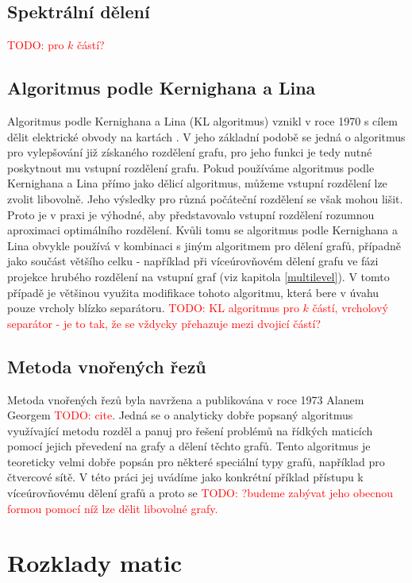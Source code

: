 \documentclass[11pt,american,czech,oneside]{book}
\theoremstyle{plain}
\theoremstyle{definition}
\newcommand{\TODO}[1]{\textcolor{red}{TODO: #1}}
\begin{document}
\section{Spektrální dělení}
\label{spektral}
\TODO{pro $k$ částí?}


\section{Algoritmus podle Kernighana a Lina}
\label{KLalgorithm}
Algoritmus podle Kernighana a Lina (KL algoritmus) vznikl v roce 1970 s cílem dělit elektrické obvody na kartách \cite{keli:70}. V jeho základní podobě se jedná o algoritmus pro vylepšování již získaného rozdělení grafu, pro jeho funkci je tedy nutné poskytnout mu vstupní rozdělení grafu. Pokud používáme algoritmus podle Kernighana a Lina přímo jako dělicí algoritmus, můžeme vstupní rozdělení lze zvolit libovolně. Jeho výsledky pro různá počáteční rozdělení se však mohou lišit. Proto je v praxi je výhodné, aby představovalo vstupní rozdělení rozumnou aproximaci optimálního rozdělení. Kvůli tomu se algoritmus podle Kernighana a Lina obvykle používá v kombinaci s jiným algoritmem pro dělení grafů, případně jako součást většího celku - například při víceúrovňovém dělení grafu ve fázi projekce hrubého rozdělení na vstupní graf (viz kapitola \ref{multilevel}). V tomto případě je většinou využita modifikace tohoto algoritmu, která bere v úvahu pouze vrcholy blízko separátoru.
\TODO{KL algoritmus pro $k$ částí, vrcholový separátor - je to tak, že se vždycky přehazuje mezi dvojicí částí?}


\section{Metoda vnořených řezů}
Metoda vnořených řezů byla navržena a publikována v roce 1973 Alanem Georgem \TODO{cite}. Jedná se o analyticky dobře popsaný algoritmus využívající metodu rozděl a panuj pro řešení problémů na řídkých maticích pomocí jejich převedení na grafy a dělení těchto grafů. Tento algoritmus je teoreticky velmi dobře popsán pro některé speciální typy grafů, například pro čtvercové sítě. V této práci jej uvádíme jako konkrétní příklad přístupu k víceúrovňovému dělení grafů a proto se \TODO{?budeme zabývat jeho obecnou formou pomocí níž lze dělit libovolné grafy.}



\chapter{Rozklady matic}
\end{document}
